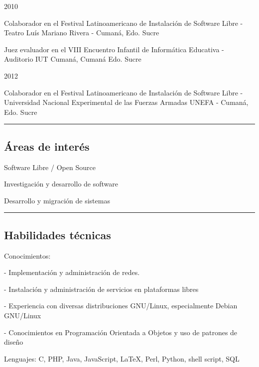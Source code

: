 \documentclass[10pt,letterpaper]{article}
\newenvironment{indentsection}[1]%
{\begin{list}{}%
	{\setlength{\leftmargin}{#1}}%
	\item[]%
}
{\end{list}}
\begin{document}
\begin{indentsection}{\parindent}
  \item {\large 2010}
    \begin{itemize*}
	    \item Colaborador en el Festival Latinoamericano de Instalación de Software Libre - Teatro Luís Mariano Rivera - Cumaná, Edo. Sucre
	    \item Juez evaluador en el VIII Encuentro Infantil de Informática Educativa - Auditorio IUT Cumaná, Cumaná Edo. Sucre
    \end{itemize*}
   \item {\large 2012}
    \begin{itemize*}
	    \item Colaborador en el Festival Latinoamericano de Instalación de Software Libre - Universidad Nacional Experimental de las Fuerzas Armadas UNEFA - Cumaná, Edo. Sucre
    \end{itemize*}
\end{indentsection}

\hrule
\vspace{-0.4em}
\subsection*{Áreas de interés}

\begin{indentsection}{\parindent}
\begin{itemize*}
  \item Software Libre / Open Source
  \item Investigación y desarrollo de software
  \item Desarrollo y migración de sistemas
\end{itemize*}
\end{indentsection}

\hrule
\vspace{-0.4em}
\subsection*{Habilidades técnicas}

\begin{indentsection}{\parindent}
\begin{description*}
  \item[Conocimientos:]
  \item - Implementación y administración de redes.
	\item - Instalación y administración de servicios en plataformas libres
	\item - Experiencia con diversas distribuciones GNU/Linux, especialmente Debian GNU/Linux
	\item - Conocimientos en Programación Orientada a Objetos y uso de patrones de diseño
	\item[Lenguajes:]
	C, PHP, Java, JavaScript, \LaTeX, Perl, Python, shell script, SQL
\end{description*}
\end{indentsection}
\end{document}
